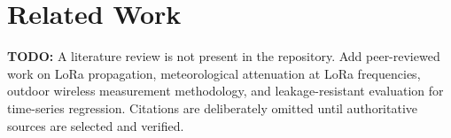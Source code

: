 \section{Related Work}
\textbf{TODO:} A literature review is not present in the repository. Add peer-reviewed work on LoRa propagation, meteorological attenuation at LoRa frequencies, outdoor wireless measurement methodology, and leakage-resistant evaluation for time-series regression. Citations are deliberately omitted until authoritative sources are selected and verified.
